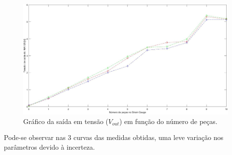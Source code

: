 \begin{figure}[H]
    \centering
    \includegraphics[scale=0.3]{img/data.jpg}
    \caption{Gráfico da saída em tensão ($V_{out}$) em função do número de peças.}
    \label{f_plottermistor}
\end{figure}

Pode-se observar nas 3 curvas das medidas obtidas, uma leve variação nos parâmetros devido à incerteza.

